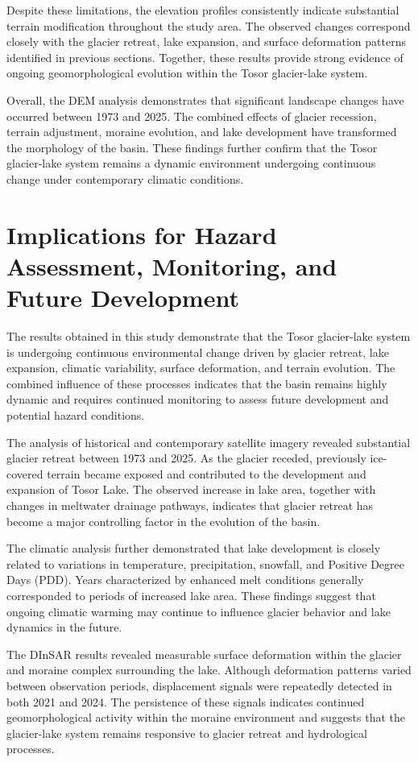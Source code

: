 \documentclass[12pt,a4paper]{report}
\begin{document}
Despite these limitations, the elevation profiles consistently indicate substantial terrain modification throughout the study area. The observed changes correspond closely with the glacier retreat, lake expansion, and surface deformation patterns identified in previous sections. Together, these results provide strong evidence of ongoing geomorphological evolution within the Tosor glacier-lake system.

Overall, the DEM analysis demonstrates that significant landscape changes have occurred between 1973 and 2025. The combined effects of glacier recession, terrain adjustment, moraine evolution, and lake development have transformed the morphology of the basin. These findings further confirm that the Tosor glacier-lake system remains a dynamic environment undergoing continuous change under contemporary climatic conditions.

\section{Implications for Hazard Assessment, Monitoring, and Future Development}

The results obtained in this study demonstrate that the Tosor glacier-lake system is undergoing continuous environmental change driven by glacier retreat, lake expansion, climatic variability, surface deformation, and terrain evolution. The combined influence of these processes indicates that the basin remains highly dynamic and requires continued monitoring to assess future development and potential hazard conditions.

The analysis of historical and contemporary satellite imagery revealed substantial glacier retreat between 1973 and 2025. As the glacier receded, previously ice-covered terrain became exposed and contributed to the development and expansion of Tosor Lake. The observed increase in lake area, together with changes in meltwater drainage pathways, indicates that glacier retreat has become a major controlling factor in the evolution of the basin.

The climatic analysis further demonstrated that lake development is closely related to variations in temperature, precipitation, snowfall, and Positive Degree Days (PDD). Years characterized by enhanced melt conditions generally corresponded to periods of increased lake area. These findings suggest that ongoing climatic warming may continue to influence glacier behavior and lake dynamics in the future.

The DInSAR results revealed measurable surface deformation within the glacier and moraine complex surrounding the lake. Although deformation patterns varied between observation periods, displacement signals were repeatedly detected in both 2021 and 2024. The persistence of these signals indicates continued geomorphological activity within the moraine environment and suggests that the glacier-lake system remains responsive to glacier retreat and hydrological processes.
\end{document}
